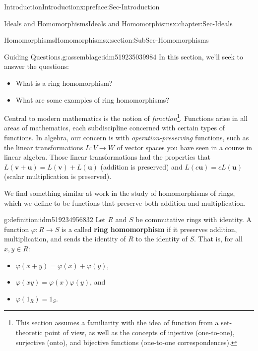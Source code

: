 \documentclass[oneside,10pt,]{book}
\newcommand{\terminology}[1]{\textbf{#1}}
\numberwithin{equation}{section}
\def\p{\varphi}
\begin{document}
\begin{preface}{Introduction}{}{Introduction}{}{}{x:preface:Sec-Introduction}
\begin{chapterptx}{Ideals and Homomorphisms}{}{Ideals and Homomorphisms}{}{}{x:chapter:Sec-Ideals}
\typeout{************************************************}
%
\begin{sectionptx}{Homomorphisms}{}{Homomorphisms}{}{}{x:section:SubSec-Homomorphisms}
\begin{assemblage}{Guiding Questions.}{g:assemblage:idm519235039984}%
In this section, we'll seek to answer the questions: %
\begin{itemize}[label=\textbullet]
\item{}What is a ring homomorphism?%
\item{}What are some examples of ring homomorphisms?%
\end{itemize}
%
\end{assemblage}
\begin{introduction}{}%
Central to modern mathematics is the notion of \emph{function}\footnote{This section assumes a familiarity with the idea of function from a set-theoretic point of view, as well as the concepts of injective (one-to-one), surjective (onto), and bijective functions (one-to-one correspondences).\label{g:fn:idm519235037184}}. Functions arise in all areas of mathematics, each subdiscipline concerned with certain types of functions. In algebra, our concern is with \emph{operation-preserving} functions, such as the linear transformations \(L : V\to W\) of vector spaces you have seen in a course in linear algebra. Those linear transformations had the properties that \(L(\mathbf{v}+\mathbf{u}) = L(\mathbf{v})+L(\mathbf{u})\) (addition is preserved) and \(L(c\mathbf{u}) = c L(\mathbf{u})\) (scalar multiplication is preserved).%
\par
We find something similar at work in the study of homomorphisms of rings, which we define to be functions that preserve both addition and multiplication.%
\end{introduction}%
\begin{definition}{}{g:definition:idm519234956832}%
Let \(R\) and \(S\) be commutative rings with identity. A function \(\p : R\to S\) is a called \terminology{ring homomorphism} if it preserves addition, multiplication, and sends the identity of \(R\) to the identity of \(S\). That is, for all \(x,y\in R\):%
\begin{itemize}[label=\textbullet]
\item{}\(\p(x+y) = \p(x) + \p(y)\),%
\item{}\(\p(xy) = \p(x)\p(y)\), and%
\item{}\(\p(1_R) = 1_S\).%
\end{itemize}

\end{definition}
\end{sectionptx}
\end{chapterptx}
\end{preface}
\end{document}
